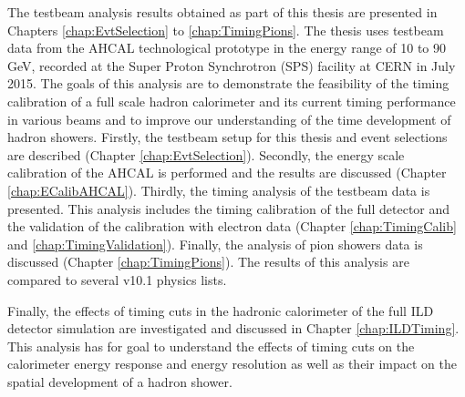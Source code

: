 The testbeam analysis results obtained as part of this thesis are presented in Chapters \ref{chap:EvtSelection} to \ref{chap:TimingPions}. The thesis uses testbeam data from the AHCAL technological prototype in the energy range of 10 to 90 GeV, recorded at the Super Proton Synchrotron (SPS) facility at CERN in July 2015. The goals of this analysis are to demonstrate the feasibility of the timing calibration of a full scale hadron calorimeter and its current timing performance in various beams and to improve our understanding of the time development of hadron showers. Firstly, the testbeam setup for this thesis and event selections are described (Chapter \ref{chap:EvtSelection}). Secondly, the energy scale calibration of the AHCAL is performed and the results are discussed (Chapter \ref{chap:ECalibAHCAL}). Thirdly, the timing analysis of the testbeam data is presented. This analysis includes the timing calibration of the full detector and the validation of the calibration with electron data (Chapter \ref{chap:TimingCalib} and \ref{chap:TimingValidation}). Finally, the analysis of pion showers data is discussed (Chapter \ref{chap:TimingPions}). The results of this analysis are compared to several \geant v10.1 physics lists.

Finally, the effects of timing cuts in the hadronic calorimeter of the full ILD detector simulation are investigated and discussed in Chapter \ref{chap:ILDTiming}. This analysis has for goal to understand the effects of timing cuts on the calorimeter energy response and energy resolution as well as their impact on the spatial development of a hadron shower.
